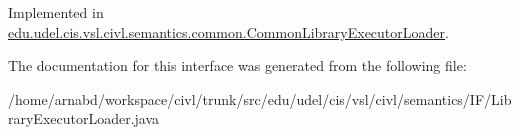 Implemented in \hyperlink{classedu_1_1udel_1_1cis_1_1vsl_1_1civl_1_1semantics_1_1common_1_1CommonLibraryExecutorLoader_a83312b42bd8bced4590447bb1c9741bf}{edu.\+udel.\+cis.\+vsl.\+civl.\+semantics.\+common.\+Common\+Library\+Executor\+Loader}.



The documentation for this interface was generated from the following file\+:\begin{DoxyCompactItemize}
\item 
/home/arnabd/workspace/civl/trunk/src/edu/udel/cis/vsl/civl/semantics/\+I\+F/Library\+Executor\+Loader.\+java\end{DoxyCompactItemize}
